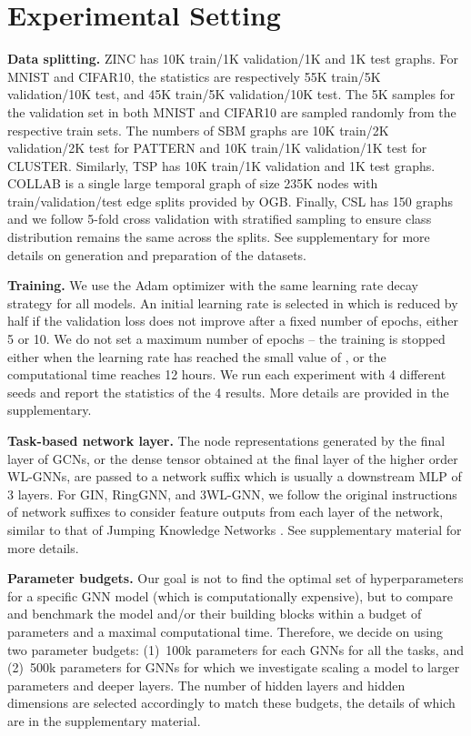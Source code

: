 \documentclass{article}
\begin{document}
\section{Experimental Setting}
\label{sec:expsetup}





{\bf Data splitting.} ZINC has 10K train/1K validation/1K and 1K test graphs. For MNIST and CIFAR10, the statistics are respectively 55K train/5K validation/10K test, and 45K train/5K validation/10K test. The 5K samples for the validation set in both MNIST and CIFAR10 are sampled randomly from the respective train sets. 
The numbers of SBM graphs are 10K train/2K validation/2K test for PATTERN and 10K train/1K validation/1K test for CLUSTER. Similarly, TSP has 10K train/1K validation and 1K test graphs. 
COLLAB is a single large temporal graph of size 235K nodes with train/validation/test edge splits provided by OGB. 
Finally, CSL has 150 graphs and we follow 5-fold cross validation with stratified sampling to ensure class distribution remains the same across the splits. 
See supplementary for more details on generation and preparation of the datasets.



{\bf Training.} We use the Adam optimizer \cite{kingma2014adam} with the same learning rate decay strategy for all models. An initial learning rate is selected in  
which is reduced by half if the validation loss does not improve after a fixed number of epochs, either 5 or 10. We do not set a maximum number of epochs -- the training is stopped either when the learning rate has reached the small value of ,
or the computational time reaches 12 hours. We run each experiment with 4 different seeds and report the statistics of the 4 results. More details are provided in the supplementary.

{\bf Task-based network layer.} The node representations generated by the final layer of GCNs, or the dense tensor obtained at the final layer of the higher order WL-GNNs, are passed to a network suffix which is usually a downstream MLP
of 3 layers. 
For GIN, RingGNN, and 3WL-GNN, we follow the original instructions of network suffixes to consider feature outputs from each layer of the network, similar to that of Jumping Knowledge Networks \cite{xu2018representation}. 
See supplementary material for more details.

{\bf Parameter budgets.} Our goal is not to find the optimal set of hyperparameters for a specific GNN model (which is computationally expensive), but to compare and benchmark the model and/or their building blocks within a budget of parameters and a maximal computational time. Therefore, we decide on using two parameter budgets: (1)~100k parameters for each GNNs for all the tasks, and (2)~500k parameters for GNNs for which we investigate scaling a model to larger parameters and deeper layers. 
The number of hidden layers and hidden dimensions are selected accordingly to match these budgets, the details of which are in the supplementary material.
\end{document}
